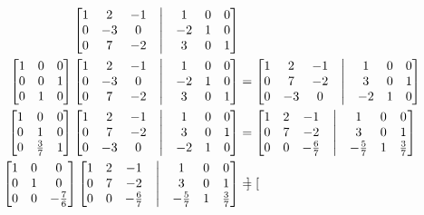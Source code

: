 \documentclass[12pt, letterpaper]{article}
\begin{document}
\begin{itemize}
\begin{enumerate}
\begin{align*}
\begin{bmatrix}
			1 & 2 & -1 & \bigm| & 1 & 0 &0\\ 0 & -3 & 0& \bigm| & -2 & 1 &0\\ 0 & 7 & -2& \bigm| & 3 & 0 &1
			\end{bmatrix}\\
			\begin{bmatrix}
				1 & 0 &0\\ 0 & 0 & 1\\ 0 & 1 &0 
			\end{bmatrix}
			\begin{bmatrix}
			1 & 2 & -1 & \bigm| & 1 & 0 &0\\ 0 & -3 & 0& \bigm| & -2 & 1 &0\\ 0 & 7 & -2& \bigm| & 3 & 0 &1
			\end{bmatrix} &= \begin{bmatrix}
			1 & 2 & -1 & \bigm| & 1 & 0 &0\\ 0 & 7 & -2& \bigm| & 3 & 0 &1\\0 & -3 & 0& \bigm| & -2 & 1 &0
			\end{bmatrix}\\
			\begin{bmatrix}1 & 0 &0 \\0 & 1 & 0\\0 & \frac{3}{7} & 1
			\end{bmatrix} \begin{bmatrix}
			1 & 2 & -1 & \bigm| & 1 & 0 &0\\ 0 & 7 & -2& \bigm| & 3 & 0 &1\\0 & -3 & 0& \bigm| & -2 & 1 &0
			\end{bmatrix} &= \begin{bmatrix}
			1 & 2 & -1 & \bigm| & 1 & 0 &0\\ 0 & 7 & -2& \bigm| & 3 & 0 &1\\0 & 0 & -\frac{6}{7}& \bigm| & -\frac{5}{7}& 1 &\frac{3}{7}
			\end{bmatrix}\\
			\begin{bmatrix}
			1 & 0 & 0\\ 0 & 1 & 0\\ 0 & 0 & -\frac{7}{6}
			\end{bmatrix}
			\begin{bmatrix}
			1 & 2 & -1 & \bigm| & 1 & 0 &0\\ 0 & 7 & -2& \bigm| & 3 & 0 &1\\0 & 0 & -\frac{6}{7}& \bigm| & -\frac{5}{7}& 1 &\frac{3}{7}
			\end{bmatrix} &= \begin{bmatrix}

\end{bmatrix}
\end{align*}
\end{enumerate}
\end{itemize}
\end{document}
